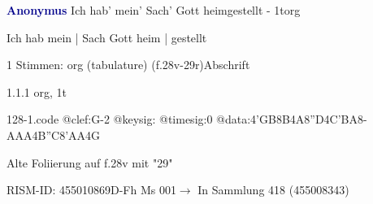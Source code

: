 \documentclass[twocolumn, 12pt]{book}
\begin{document}
\par \vspace{16pt} \textcolor{darkblue}{\textbf{Anonymus  }}\hfillplus{\textbf{[128]}}\newline Ich hab' mein' Sach' Gott heimgestellt - 1t\newline org
\par \begin{itshape}[f.28v, at left:] Ich hab mein | Sach Gott heim | gestellt\end{itshape} 
\par \textcolor{darkblue}{}  1 Stimmen: org (tabulature)  (f.28v-29r)\newline Abschrift
\par 1.1.1  org, 1t  
\begin{filecontents*}{128-1.code}
@clef:G-2
@keysig:
@timesig:0
@data:4'GB8B4A8''D4C'BA8-{AAA}4B''C{8'AA}4G
\end{filecontents*}
\newline %
\par Alte Foliierung auf f.28v mit "29"
\par RISM-ID: 455010869\newline D-Fh  Ms 001\newline $\rightarrow$ In Sammlung 418 (455008343)
      
\end{document}
